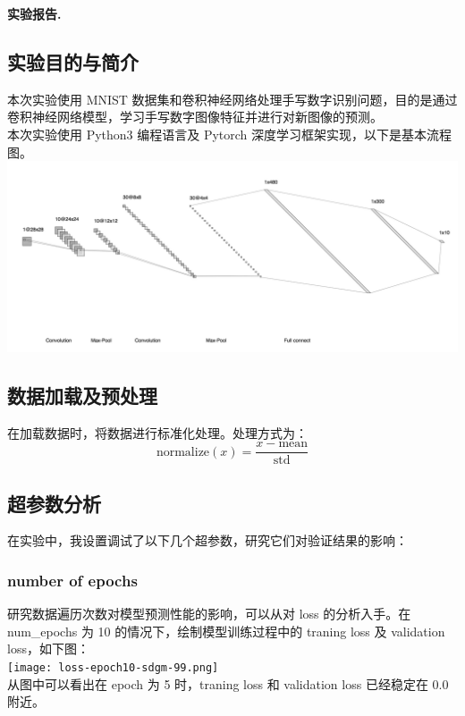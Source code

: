 \documentclass{article}
\begin{document}
	\clearpage
	\noindent\textbf{实验报告.}
	\subsection{实验目的与简介}
	本次实验使用 MNIST 数据集和卷积神经网络处理手写数字识别问题，目的是通过卷积神经网络模型，学习手写数字图像特征并进行对新图像的预测。\\
	\indent 本次实验使用 Python3 编程语言及 Pytorch 深度学习框架实现，以下是基本流程图。\\
	\includegraphics[width = 1.0\textwidth]{nn-architecture.png} \\

	\subsection{数据加载及预处理}
	在加载数据时，将数据进行标准化处理。处理方式为：
	\begin{equation}
		\text{normalize}(x) = \frac{x - \text{mean}}{\text{std}}
	\end{equation}

	\subsection{超参数分析}
	在实验中，我设置调试了以下几个超参数，研究它们对验证结果的影响：\\
	\subsubsection{number of epochs}
	研究数据遍历次数对模型预测性能的影响，可以从对 loss 的分析入手。在 num\_epochs 为 10 的情况下，绘制模型训练过程中的 traning loss 及 validation loss，如下图：\\
	\indent \texttt{[image: loss-epoch10-sdgm-99.png]}\\
	\indent 从图中可以看出在 epoch 为 5 时，traning loss 和 validation loss 已经稳定在 0.0 附近。
\end{document}

